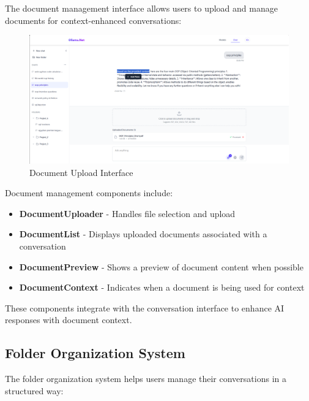 The document management interface allows users to upload and manage documents for context-enhanced conversations:

\begin{figure}[p]
    \centering
    \includegraphics[width=\textwidth]{./Chapter07/figures/document_upload_ui.png}
    \caption{Document Upload Interface}
    \label{fig:document-upload-ui}
\end{figure}
\clearpage

Document management components include:

\begin{itemize}
  \item \textbf{DocumentUploader} - Handles file selection and upload
  \item \textbf{DocumentList} - Displays uploaded documents associated with a conversation
  \item \textbf{DocumentPreview} - Shows a preview of document content when possible
  \item \textbf{DocumentContext} - Indicates when a document is being used for context
\end{itemize}

These components integrate with the conversation interface to enhance AI responses with document context.

\subsection{Folder Organization System}

The folder organization system helps users manage their conversations in a structured way:


